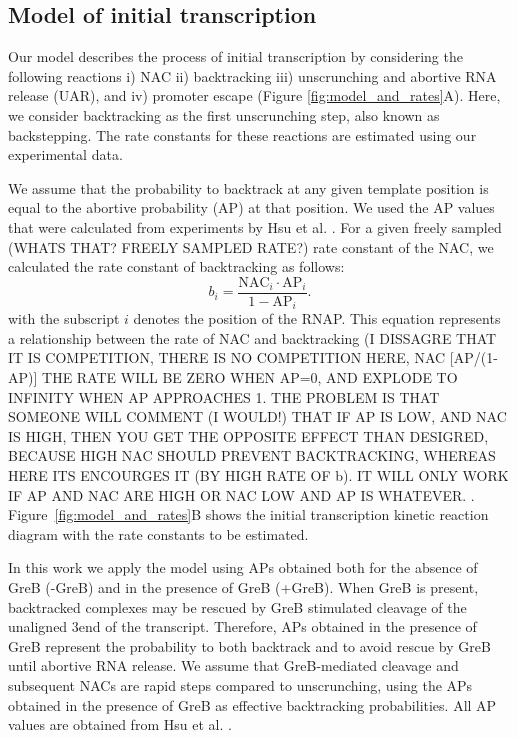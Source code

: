 %
\subsection{Model of initial transcription}
Our model describes the process of initial transcription by considering the following  
reactions  i) NAC ii) backtracking iii) unscrunching and abortive RNA release (UAR),
and iv) promoter escape (Figure \ref{fig:model_and_rates}A). Here, we consider backtracking  as the first unscrunching step,
also known as backstepping. The rate
constants for these reactions are estimated using our
experimental data.

We assume that the probability to
backtrack at any given template position is equal to the abortive probability (AP) at
that position. We used the AP values that were calculated from experiments by Hsu et al. \cite{hsu_initial_2006}. For a given
freely sampled (WHATS THAT? FREELY SAMPLED RATE?) rate constant of the NAC, we calculated the rate constant of
backtracking as follows:
\begin{equation}
  b_i = \frac{\text{NAC}_i\cdot\text{AP}_i}{1-\text{AP}_i}.
  \label{eq:backtrackingcalc}
\end{equation}
with the subscript $i$ denotes the position of the RNAP. This equation represents a relationship between the rate of NAC and
backtracking (I DISSAGRE THAT IT IS COMPETITION, THERE IS NO COMPETITION HERE, NAC [AP/(1-AP)] THE RATE WILL BE ZERO WHEN AP=0, AND EXPLODE TO INFINITY WHEN AP APPROACHES 1. THE PROBLEM IS THAT SOMEONE WILL COMMENT (I WOULD!) THAT IF AP IS LOW, AND NAC IS HIGH, THEN YOU GET THE OPPOSITE EFFECT THAN DESIGRED, BECAUSE HIGH NAC SHOULD PREVENT BACKTRACKING, WHEREAS HERE ITS ENCOURGES IT (BY HIGH RATE OF b). IT WILL ONLY WORK IF AP AND NAC ARE HIGH OR NAC LOW AND AP IS WHATEVER.  . Figure~\ref{fig:model_and_rates}B shows the initial
transcription kinetic reaction diagram with the rate constants to be estimated. 

In this work we apply the model using APs obtained both for the absence of
GreB (-GreB) and in the presence of GreB (+GreB). When GreB is present,
backtracked complexes may be rescued by GreB stimulated cleavage of the
unaligned 3\ppp end of the transcript. Therefore, APs obtained in the presence
of GreB represent the probability to both backtrack and to avoid rescue by
GreB until abortive RNA release. We assume that GreB-mediated cleavage and
subsequent NACs are rapid steps compared to unscrunching, using the APs
obtained in the presence of GreB as effective backtracking probabilities. All
AP values are obtained from Hsu et al. \cite{hsu_initial_2006}.

